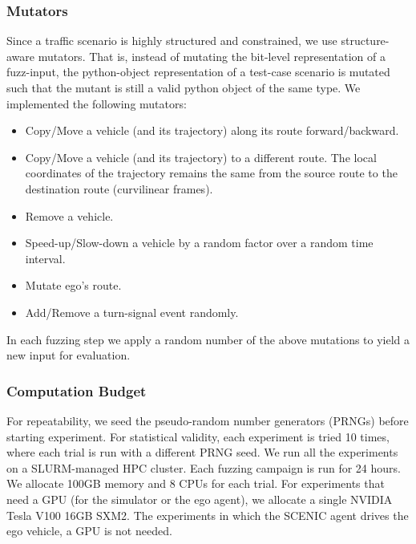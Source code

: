 \subsubsection{Mutators}
Since a traffic scenario is highly structured and constrained, we use structure-aware mutators.
%
That is, instead of mutating the bit-level representation of a fuzz-input,
the python-object representation of a test-case scenario is mutated such that
the mutant is still a valid python object of the same type.
%
We implemented the following mutators:
\begin{itemize}
    \item Copy/Move a vehicle (and its trajectory) along its route forward/backward.
    \item Copy/Move a vehicle (and its trajectory) to a different route. The local coordinates of the trajectory remains the same from the source route to the destination route (curvilinear frames).
    \item Remove a vehicle.
    \item Speed-up/Slow-down a vehicle by a random factor over a random time interval.
    \item Mutate ego’s route.
    \item Add/Remove a turn-signal event randomly.
\end{itemize}
%
In each fuzzing step we apply a random number of the above mutations to yield a new input for evaluation.


\subsubsection{Computation Budget}
For repeatability, we seed the pseudo-random number generators (PRNGs) before starting experiment.
%
For statistical validity, each experiment is tried 10 times, where each trial is run with a different PRNG seed.
%
We run all the experiments on a SLURM-managed HPC cluster.
%
Each fuzzing campaign is run for 24 hours.
%
We allocate 100GB memory and 8 CPUs for each trial.
%
For experiments that need a GPU (for the simulator or the ego agent),
we allocate a single NVIDIA Tesla V100 16GB SXM2.
%
The experiments in which the SCENIC agent drives the ego vehicle, a GPU is not needed.
